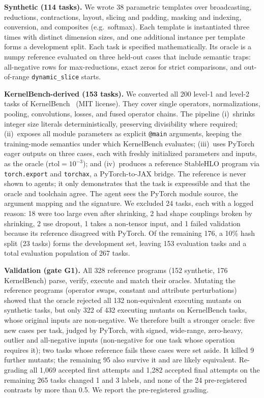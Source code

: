 \textbf{Synthetic (114 tasks).} We wrote 38 parametric templates over broadcasting, reductions, contractions, layout, slicing and padding, masking and indexing, conversion, and composites (e.g.\ softmax). Each template is instantiated three times with distinct dimension sizes, and one additional instance per template forms a development split. Each task is specified mathematically. Its oracle is a numpy reference evaluated on three held-out cases that include semantic traps: all-negative rows for max-reductions, exact zeros for strict comparisons, and out-of-range \texttt{dynamic\_slice} starts.

\textbf{KernelBench-derived (153 tasks).} We converted all 200 level-1 and level-2 tasks of KernelBench~\cite{ouyang2025kernelbench} (MIT license). They cover single operators, normalizations, pooling, convolutions, losses, and fused operator chains. The pipeline (i)~shrinks integer size literals deterministically, preserving divisibility where required; (ii)~exposes all module parameters as explicit \texttt{@main} arguments, keeping the training-mode semantics under which KernelBench evaluates; (iii)~uses PyTorch eager outputs on three cases, each with freshly initialized parameters and inputs, as the oracle ($\mathrm{rtol}{=}10^{-3}$); and (iv)~produces a reference StableHLO program via \texttt{torch.export} and \texttt{torchax}, a PyTorch-to-JAX bridge. The reference is never shown to agents; it only demonstrates that the task is expressible and that the oracle and toolchain agree. The agent sees the PyTorch module source, the argument mapping and the signature. We excluded 24 tasks, each with a logged reason: 18 were too large even after shrinking, 2 had shape couplings broken by shrinking, 2 use dropout, 1 takes a non-tensor input, and 1 failed validation because its reference disagreed with PyTorch. Of the remaining 176, a 10\% hash split (23 tasks) forms the development set, leaving 153 evaluation tasks and a total evaluation population of 267 tasks.

\textbf{Validation (gate G1).} All 328 reference programs (152 synthetic, 176 KernelBench) parse, verify, execute and match their oracles. Mutating the reference programs (operator swaps, constant and attribute perturbations) showed that the oracle rejected all 132 non-equivalent executing mutants on synthetic tasks, but only 322 of 432 executing mutants on KernelBench tasks, whose original inputs are non-negative. We therefore built a stronger oracle: five new cases per task, judged by PyTorch, with signed, wide-range, zero-heavy, outlier and all-negative inputs (non-negative for one task whose operation requires it); two tasks whose reference fails these cases were set aside. It killed 9 further mutants; the remaining 95 also survive it and are likely equivalent. Re-grading all 1{,}069 accepted first attempts and 1{,}282 accepted final attempts on the remaining 265 tasks changed 1 and 3 labels, and none of the 24 pre-registered contrasts by more than 0.5\pp. We report the pre-registered grading.

